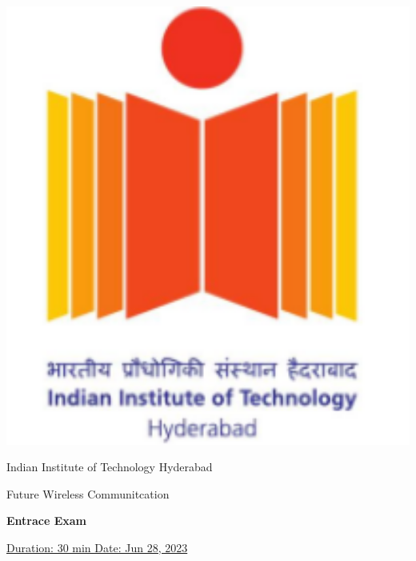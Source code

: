 \documentclass[12pt, a4paper]{exam}
\begin{document}
	\noindent
	\begin{minipage}[l]{0.1\textwidth}
		\noindent
		\includegraphics[width=1.6\textwidth]{figs/logo.png}
	\end{minipage}
\hfill
\begin{minipage}[c]{0.8\textwidth}
	\begin{center}
		\large	Indian Institute of Technology Hyderabad \par
		\large	Future Wireless Communitcation \par
	\large \textbf{Entrace Exam}%
	\end{center}
\end{minipage}
\par
\vspace{0.2in}
\noindent
\uline{Duration: 30 min \hfill Date: Jun 28, 2023}%
\par 
\vspace{0.15in}
\noindent
\centering
\end{document}
